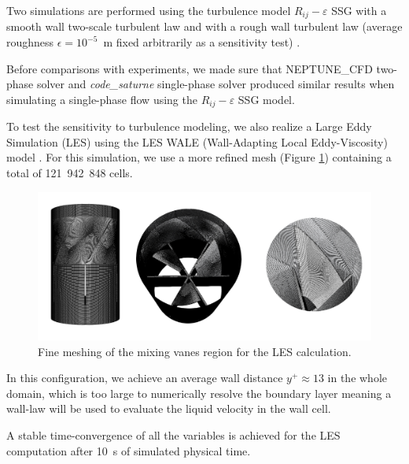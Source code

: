 \npar

Two simulations are performed using the turbulence model $R_{ij}-\varepsilon$ SSG with a smooth wall two-scale turbulent law and with a rough wall turbulent law (average roughness $\epsilon = 10^{-5}$\ m fixed arbitrarily as a sensitivity test) \cite{noauthor_code_saturne_2021}. 

\begin{note*}{}
Before comparisons with experiments, we made sure that NEPTUNE\_CFD two-phase solver and \textit{code\_saturne} single-phase solver produced similar results when simulating a single-phase flow using the $R_{ij}-\varepsilon$ SSG model.
\end{note*}



To test the sensitivity to turbulence modeling, we also realize a Large Eddy Simulation (LES) using the LES WALE (Wall-Adapting Local Eddy-Viscosity) model \cite{nicoud_subgrid-scale_1999}. For this simulation, we use a more refined mesh (Figure \ref{fig:prom_M4}) containing a total of 121~942~848 cells. 

%
\begin{figure}[!h]
\centering
\includegraphics[width=1.0\linewidth]{img/AGATE/prom_M4_all.png}
\caption{Fine meshing of the mixing vanes region for the LES calculation.}
\label{fig:prom_M4}
\end{figure}
%

\npar


In this configuration, we achieve an average wall distance $y^{+} \approx 13$ in the whole domain, which is too large to numerically resolve the boundary layer meaning a wall-law will be used to evaluate the liquid velocity in the wall cell. 

\begin{note*}{}
A stable time-convergence of all the variables is achieved for the LES computation after 10~s of simulated physical time.
\end{note*}

